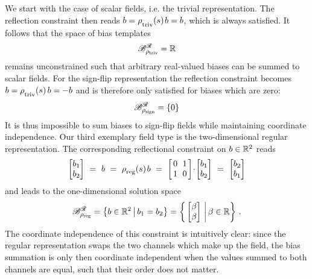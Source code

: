 We start with the case of scalar fields, i.e. the trivial representation.
The reflection constraint then reads $b = \rho_{\overset{}{\textup{triv}}}(s)\mkern2mu b = b$, which is always satisfied.
It follows that the space of bias templates
\begin{align}
    \mathscr{B}^{\Flip}_{\scalebox{.8}{$\rho_{{\textup{triv}}}$}} = \R
\end{align}
remains unconstrained such that arbitrary real-valued biases can be summed to scalar fields.
For the sign-flip representation the reflection constraint becomes $b = \rho_{\overset{}{\textup{triv}}}(s)\, b = -b$ and is therefore only satisfied for biases which are zero:
\begin{align}
    \mathscr{B}^{\Flip}_{\scalebox{.8}{$\rho_{{\textup{sign}}}$}} = \{0\}
\end{align}
It is thus impossible to sum biases to sign-flip fields while maintaining coordinate independence.
Our third exemplary field type is the two-dimensional regular representation.
The corresponding reflectional constraint on $b\in\mathbb{R}^2$ reads
\begin{align}
    \begin{bmatrix} b_1 \\ b_2 \end{bmatrix}
    \ =\ 
    b
    \ =\ 
    \rhoreg(s)\mkern2mu b
    \ =\ 
    \begin{bmatrix} \hspace{1.5pt}
        0 &\mkern-7mu 1 \hspace*{1.5pt} \\ \hspace{1.5pt} 1 &\mkern-7mu 0 \hspace*{1.5pt}
    \end{bmatrix}
    \!\cdot\! \begin{bmatrix} b_1 \\ b_2 \end{bmatrix}
    \ =\ 
    \begin{bmatrix} b_2 \\ b_1 \end{bmatrix}
\end{align}
and leads to the one-dimensional solution space
\begin{align}\label{eq:bias_solution_space_regular}
    \mathscr{B}^{\Flip}_{\scalebox{.8}{$\rho_{{\textup{reg}}}$}} = 
    \big\{ b\in\R^2 \,\big|\, b_1=b_2 \big\} =
    \bigg\{ \begin{bmatrix} \beta \\ \beta \end{bmatrix} \,\bigg|\, \beta\in\R \bigg\} \ .
\end{align}
The coordinate independence of this constraint is intuitively clear:
since the regular representation swaps the two channels which make up the field, the bias summation is only then coordinate independent when the values summed to both channels are equal, such that their order does not matter.

